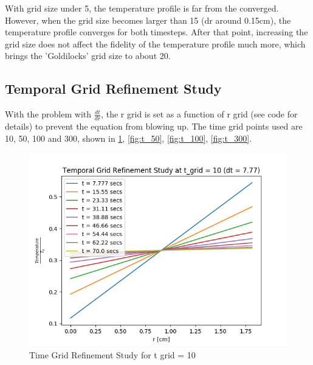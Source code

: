 \documentclass[12pt,letterpaper]{article}
\begin{document}
With grid size under 5, the temperature profile is far from the converged.
However, when the grid size becomes larger than 15 (dr around 0.15cm),
the temperature profile converges for both timesteps. After that point,
increasing the grid size does not affect the fidelity of the temperature
profile much more, which brings the 'Goldilocks' grid size to about 20.

\subsection*{Temporal Grid Refinement Study}

With the problem with $\frac{dt}{dr}$, the r grid is set as a function
of r grid (see code for details) to prevent the equation from blowing up.
The time grid points used are 10, 50, 100 and 300, shown in \cref{fig:t_10},
\ref{fig:t_50}, \ref{fig:t_100}, \ref{fig:t_300}.


\begin{figure}[htbp!]
  \begin{center}
    \includegraphics[scale=0.7]{t_grid_10.png}
  \end{center}
  \caption{Time Grid Refinement Study for t grid = 10}
  \label{fig:t_10}
\end{figure}
\end{document}
